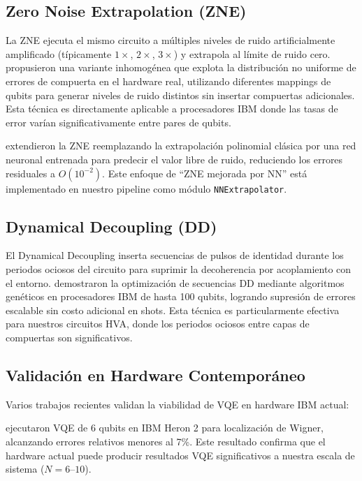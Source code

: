 \documentclass[11pt,a4paper,spanish]{book}
\begin{document}
\subsection{Zero Noise Extrapolation (ZNE)}

La ZNE ejecuta el mismo circuito a múltiples niveles de ruido artificialmente amplificado (típicamente $1\times$, $2\times$, $3\times$) y extrapola al límite de ruido cero. \citet{uvarov2024} propusieron una variante inhomogénea que explota la distribución no uniforme de errores de compuerta en el hardware real, utilizando diferentes mappings de qubits para generar niveles de ruido distintos sin insertar compuertas adicionales. Esta técnica es directamente aplicable a procesadores IBM donde las tasas de error varían significativamente entre pares de qubits.

\citet{sun2025} extendieron la ZNE reemplazando la extrapolación polinomial clásica por una red neuronal entrenada para predecir el valor libre de ruido, reduciendo los errores residuales a $O(10^{-2})$. Este enfoque de ``ZNE mejorada por NN'' está implementado en nuestro pipeline como módulo \texttt{NNExtrapolator}.

\subsection{Dynamical Decoupling (DD)}

El Dynamical Decoupling inserta secuencias de pulsos de identidad durante los periodos ociosos del circuito para suprimir la decoherencia por acoplamiento con el entorno. \citet{pokharel2025} demostraron la optimización de secuencias DD mediante algoritmos genéticos en procesadores IBM de hasta 100 qubits, logrando supresión de errores escalable sin costo adicional en shots. Esta técnica es particularmente efectiva para nuestros circuitos HVA, donde los periodos ociosos entre capas de compuertas son significativos.

\subsection{Validación en Hardware Contemporáneo}

Varios trabajos recientes validan la viabilidad de VQE en hardware IBM actual:

\citet{kiiamov2026} ejecutaron VQE de 6 qubits en IBM Heron 2 para localización de Wigner, alcanzando errores relativos menores al 7\%. Este resultado confirma que el hardware actual puede producir resultados VQE significativos a nuestra escala de sistema ($N = 6$--$10$).
\end{document}
